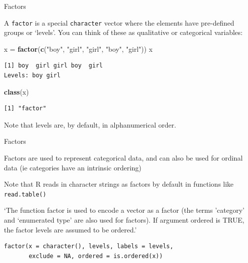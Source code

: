 \documentclass[
  ignorenonframetext,
]{beamer}
\newenvironment{Shaded}{\begin{snugshade}}{\end{snugshade}}
\newcommand{\KeywordTok}[1]{\textcolor[rgb]{0.13,0.29,0.53}{\textbf{#1}}}
\newcommand{\NormalTok}[1]{#1}
\newcommand{\StringTok}[1]{\textcolor[rgb]{0.31,0.60,0.02}{#1}}
\begin{document}
\begin{frame}[fragile]{Factors}
\protect\hypertarget{factors}{}

A \texttt{factor} is a special \texttt{character} vector where the
elements have pre-defined groups or `levels'. You can think of these as
qualitative or categorical variables:

\begin{Shaded}
\begin{Highlighting}[]
\NormalTok{x =}\StringTok{ }\KeywordTok{factor}\NormalTok{(}\KeywordTok{c}\NormalTok{(}\StringTok{"boy"}\NormalTok{, }\StringTok{"girl"}\NormalTok{, }\StringTok{"girl"}\NormalTok{, }\StringTok{"boy"}\NormalTok{, }\StringTok{"girl"}\NormalTok{))}
\NormalTok{x }
\end{Highlighting}
\end{Shaded}

\begin{verbatim}
[1] boy  girl girl boy  girl
Levels: boy girl
\end{verbatim}

\begin{Shaded}
\begin{Highlighting}[]
\KeywordTok{class}\NormalTok{(x)}
\end{Highlighting}
\end{Shaded}

\begin{verbatim}
[1] "factor"
\end{verbatim}

Note that levels are, by default, in alphanumerical order.

\end{frame}

\begin{frame}[fragile]{Factors}
\protect\hypertarget{factors-1}{}

Factors are used to represent categorical data, and can also be used for
ordinal data (ie categories have an intrinsic ordering)

Note that R reads in character strings as factors by default in
functions like \texttt{read.table()}

`The function factor is used to encode a vector as a factor (the terms
'category' and `enumerated type' are also used for factors). If argument
ordered is TRUE, the factor levels are assumed to be ordered.'

\begin{verbatim}
factor(x = character(), levels, labels = levels,
       exclude = NA, ordered = is.ordered(x))
\end{verbatim}

\end{frame}
\end{document}
